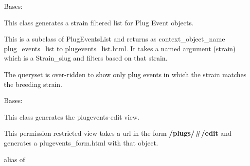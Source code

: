 \documentclass[letterpaper,10pt,english]{sphinxmanual}
\begin{document}

\begin{fulllineitems}
\label{api:mousedb.timed_mating.views.PlugEventsListStrain}
Bases: {\hyperref[api:mousedb.timed_mating.views.PlugEventsList]{}}

This class generates a strain filtered list for Plug Event objects.

This is a subclass of PlugEventsList and returns as context\_object\_name plug\_events\_list to plugevents\_list.html.
It takes a named argument (strain) which is a Strain\_slug and filters based on that strain.


\begin{fulllineitems}
\label{api:mousedb.timed_mating.views.PlugEventsListStrain.get_queryset}
The queryset is over-ridden to show only plug events in which the strain matches the breeding strain.

\end{fulllineitems}


\end{fulllineitems}



\begin{fulllineitems}
\label{api:mousedb.timed_mating.views.PlugEventsUpdate}
Bases: {\hyperref[api:mousedb.views.RestrictedUpdateView]{}}

This class generates the plugevents-edit view.

This permission restricted view takes a url in the form \textbf{/plugs/\#/edit} and generates a plugevents\_form.html with that object.


\begin{fulllineitems}
\label{api:mousedb.timed_mating.views.PlugEventsUpdate.model}
alias of 

\end{fulllineitems}


\end{fulllineitems}
\end{document}
